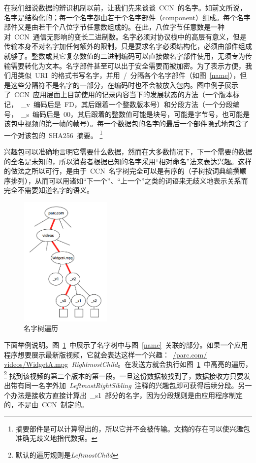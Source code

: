 在我们细说数据的辨识机制以前，让我们先来谈谈~CCN~的名字。如前文所说，名字是结构化的；每一个名字都由若干个名字部件（component）组成。每个名字部件又是由若干个八位字节任意数组成的。在此，八位字节任意数是一种对~CCN~通信无影响的变长二进制数。名字必须对协议栈中的高层有意义，但是传输本身不对名字加任何额外的限制，只是要求名字必须结构化，必须由部件组成就够了。整数或其它复杂数值的二进制编码可以直接做名字部件使用，无须专为传输需要转化为文本。名字部件甚至可以出于安全需要而被加密。为了表示方便，我们用类似~URI~的格式书写名字，并用~\slash~分隔各个名字部件（如图~\ref{name}），但是这些分隔符不是名字的一部分，在编码时也不会被放入包内。图中例子展示了~CCN~应用层面上目前使用的记录内容当下的发展状态的方法（一个版本标记，~\_v~编码后是~FD，其后跟着一个整数版本号）和分段方法（一个分段编号，~\_s~编码后是~00，其后跟着的整数值可能是块号，可能是字节号，也可能是该包中视频的第一帧的帧号）。每一个数据包的名字的最后一个部件隐式地包含了一个对该包的~SHA256~摘要。
\renewcommand\baselinestretch{1} %
\footnote{摘要部件是可以计算得出的，所以它并不会被传输。文摘的存在可以使兴趣包准确无歧义地指代数据。} %

兴趣包可以准确地言明它需要什么数据，然而在大多数情况下，下一个需要的数据的全名是未知的，所以消费者根据已知的名字采用“相对命名”法来表达兴趣。这样的做法之所以可行，是由于~CCN~名字树完全可以是有序的（子树按词典编撰顺序排列），从而可以用诸如“下一个”、“上一个”之类的词语来无歧义地表示关系而完全不需要知道名字的语义。

\begin{figure}
  \centering
  \includegraphics[width=0.4\textwidth]{images/name_tree}
  \caption{名字树遍历} 
  \label{name_tree}
\end{figure}

下面举例说明。图~\ref{name_tree}~中展示了名字树中与图~\ref{name}~关联的部分。如果一个应用程序想要展示最新版视频，它就会表达这样一个兴趣：~\url{/parc.com/ videos/WidgetA.mpg}~\emph{RightmostChild}。在发送方就会执行如图~\ref{name_tree}~中高亮的遍历，
\renewcommand\baselinestretch{1} %
\footnote{默认的遍历规则是\emph{LeftmostChild}}
找到该视频的第二个版本的第一段。一旦这份数据被找到了，数据接收方只要发出带有同一名字外加~\emph{LeftmostRightSibling}~注释的兴趣包即可获得后续分段。另一个办法是接收方直接计算出~\_s1~部分的名字，因为分段规则是由应用程序制定的，不是由~CCN~制定的。

